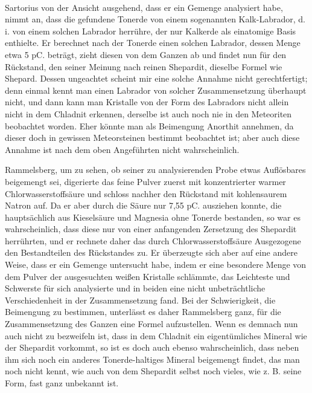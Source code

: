\documentclass[a4paper, 11pt, oneside]{article}
\begin{document}
\paragraph{}
Sartorius von der Ansicht ausgehend, dass er ein Gemenge analysiert habe, nimmt an, dass die gefundene Tonerde von einem sogenannten Kalk-Labrador, d. i. von einem solchen Labrador herrühre, der nur Kalkerde als einatomige Basis enthielte. Er berechnet nach der Tonerde einen solchen Labrador, dessen Menge etwa 5 pC. beträgt, zieht diesen von dem Ganzen ab und findet nun für den Rückstand, den seiner Meinung nach reinen Shepardit, dieselbe Formel wie Shepard. Dessen ungeachtet scheint mir eine solche Annahme nicht gerechtfertigt; denn einmal kennt man einen Labrador von solcher Zusammensetzung überhaupt nicht, und dann kann man Kristalle von der Form des Labradors nicht allein nicht in dem Chladnit erkennen, derselbe ist auch noch nie in den Meteoriten beobachtet worden. Eher könnte man als Beimengung Anorthit annehmen, da dieser doch in gewissen Meteorsteinen bestimmt beobachtet ist; aber auch diese Annahme ist nach dem oben Angeführten nicht wahrscheinlich.

Rammelsberg, um zu sehen, ob seiner zu analysierenden Probe etwas Auflösbares beigemengt sei, digerierte das feine Pulver zuerst mit konzentrierter warmer Chlorwasserstoffsäure und schloss nachher den Rückstand mit kohlensaurem Natron auf. Da er aber durch die Säure nur 7,55 pC. ausziehen konnte, die hauptsächlich aus Kieselsäure und Magnesia ohne Tonerde bestanden, so war es wahrscheinlich, dass diese nur von einer anfangenden Zersetzung des Shepardit herrührten, und er rechnete daher das durch Chlorwasserstoffsäure Ausgezogene den Bestandteilen des Rückstandes zu. Er überzeugte sich aber auf eine andere Weise, dass er ein Gemenge untersucht habe, indem er eine besondere Menge von dem Pulver der ausgesuchten weißen Kristalle schlämmte, das Leichteste und Schwerste für sich analysierte und in beiden eine nicht unbeträchtliche Verschiedenheit in der Zusammensetzung fand. Bei der Schwierigkeit, die Beimengung zu bestimmen, unterlässt es daher Rammelsberg ganz, für die Zusammensetzung des Ganzen eine Formel aufzustellen. Wenn es demnach nun auch nicht zu bezweifeln ist, dass in dem Chladnit ein eigentümliches Mineral wie der Shepardit vorkommt, so ist es doch auch ebenso wahrscheinlich, dass neben ihm sich noch ein anderes Tonerde-haltiges Mineral beigemengt findet, das man noch nicht kennt, wie auch von dem Shepardit selbst noch vieles, wie z. B. seine Form, fast ganz unbekannt ist.
\end{document}
